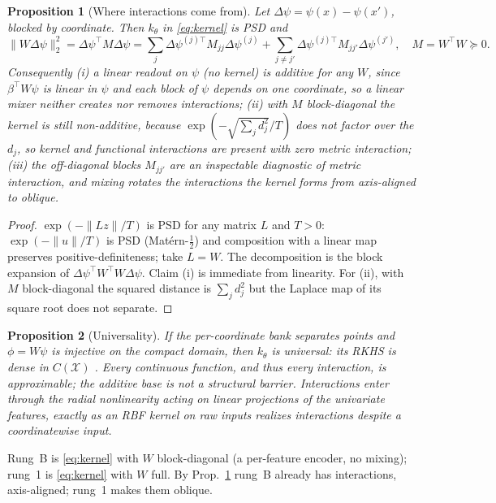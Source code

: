 \documentclass[11pt]{article}
\newtheorem{proposition}{Proposition}
\theoremstyle{definition}
\newcommand{\X}{\mathcal{X}}
\newcommand{\norm}[1]{\lVert #1 \rVert}
\begin{document}
\begin{proposition}[Where interactions come from]\label{prop:interaction}
Let $\Delta\psi=\psi(x)-\psi(x')$, blocked by coordinate. Then $k_\theta$ in \eqref{eq:kernel}
is PSD and
\begin{equation}
\norm{W\Delta\psi}_2^2=\Delta\psi^\top M\Delta\psi
=\sum_j\Delta\psi^{(j)\top}M_{jj}\Delta\psi^{(j)}
+\sum_{j\neq j'}\Delta\psi^{(j)\top}M_{jj'}\Delta\psi^{(j')},\quad M=W^\top W\succeq0.
\end{equation}
Consequently \textup{(i)} a linear readout on $\psi$ (no kernel) is additive for any $W$, since
$\beta^\top W\psi$ is linear in $\psi$ and each block of $\psi$ depends on one coordinate, so a
linear mixer neither creates nor removes interactions; \textup{(ii)} with $M$ block-diagonal the
kernel is still non-additive, because $\exp(-\sqrt{\sum_j d_j^2}/T)$ does not factor over the
$d_j$, so kernel and functional interactions are present with zero metric interaction; \textup{(iii)}
the off-diagonal blocks $M_{jj'}$ are an inspectable diagnostic of \emph{metric} interaction, and
mixing rotates the interactions the kernel forms from axis-aligned to oblique.
\end{proposition}
\begin{proof}
$\exp(-\norm{Lz}/T)$ is PSD for any matrix $L$ and $T>0$: $\exp(-\norm{u}/T)$ is PSD
(Mat\'ern-$\tfrac12$) and composition with a linear map preserves positive-definiteness; take
$L=W$. The decomposition is the block expansion of $\Delta\psi^\top W^\top W\Delta\psi$. Claim
(i) is immediate from linearity. For (ii), with $M$ block-diagonal the squared distance is
$\sum_j d_j^2$ but the Laplace map of its square root does not separate.
\end{proof}

\begin{proposition}[Universality]\label{prop:universal}
If the per-coordinate bank separates points and $\phi=W\psi$ is injective on the compact domain,
then $k_\theta$ is universal: its RKHS is dense in $C(\X)$ \citep{micchelli2006}. Every
continuous function, and thus every interaction, is approximable; the additive base is not a
structural barrier. Interactions enter through the radial nonlinearity acting on linear
projections of the univariate features, exactly as an RBF kernel on raw inputs realizes
interactions despite a coordinatewise input.
\end{proposition}

Rung~B is \eqref{eq:kernel} with $W$ block-diagonal (a per-feature encoder, no mixing); rung~1
is \eqref{eq:kernel} with $W$ full. By Prop.~\ref{prop:interaction} rung~B already has
interactions, axis-aligned; rung~1 makes them oblique.
\end{document}

